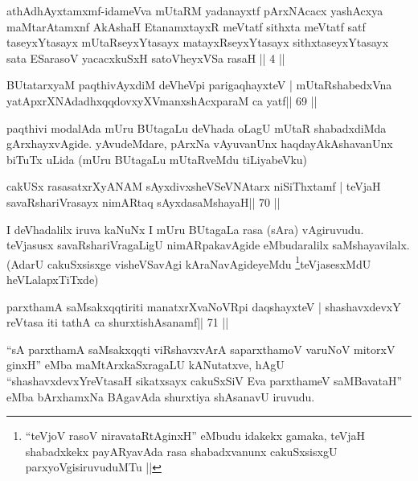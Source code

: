 \medskip

\begin{kandikeshl}
athAdhAyxtamxmf-idameVva mUtaRM yadanayxtf pArxNAcacx yashAcxya
maMtarAtamxnf AkAshaH EtanamxtayxR meVtatf sithxta meVtatf satf
taseyxYtasayx mUtaRseyxYtasayx matayxRseyxYtasayx sithxtaseyxYtasayx
sata ESarasoV yacacxkuSxH satoVheyxVSa rasaH || 4 ||
\end{kandikeshl}


\begin{shl}
BUtatarxyaM paqthivAyxdiM deVheV\s pi parigaqhayxteV |
mUtaRshabedxVna yatApxrXNAdadhxqqdovxyXVmanxshAcxparaM ca yatf\hfill || 69 ||
\end{shl}

\begin{artha}
paqthivi modalAda mUru BUtagaLu deVhada oLagU mUtaR shabadxdiMda
gArxhayxvAgide. yAvudeMdare, pArxNa vAyuvanUnx haqdayAkAshavanUnx
biTuTx uLida (mUru BUtagaLu mUtaRveMdu tiLiyabeVku)
\end{artha}



\begin{shl}
cakUSx rasasatxrXyANAM sAyxdivxsheVSeVNAtarx niSiThxtamf |
teVjaH savaRshariVrasayx nimARtaq sAyxdasaMshayaH\hfill || 70 ||
\end{shl}

\begin{artha}
I deVhadalilx iruva kaNuNx I mUru BUtagaLa rasa (sAra) vAgiruvudu.
teVjasusx savaRshariVragaLigU nimARpakavAgide eMbudaralilx
saMshayavilalx. (AdarU cakuSxsisxge visheVSavAgi
kAraNavAgideyeMdu \footnote{``teVjoV rasoV niravataRtAginxH'' eMbudu
  idakekx gamaka, teVjaH shabadxkekx payARyavAda rasa shabadxvanunx
  cakuSxsisxgU parxyoVgisiruvuduMTu ||}teVjasesxMdU heVLalapxTiTxde)
\end{artha}


\begin{shl}
parxthamA saMsakxqqtiriti manatxrXvaNoVR\s pi daqshayxteV |
shashavxdevxY reVtasa iti tathA ca shurxtishAsanamf\hfill || 71 ||
\end{shl}

\begin{artha}
``sA parxthamA saMsakxqqti viRshavxvArA saparxthamoV varuNoV mitorxV\s
  ginxH'' eMba maMtArxkaSxragaLU kANutatxve, hAgU
  ``shashavxdevxYreVtasaH sikatxsayx cakuSxSiV Eva parxthameV
  saMBavataH'' eMba bArxhamxNa BAgavAda shurxtiya shAsanavU iruvudu.
\end{artha}

